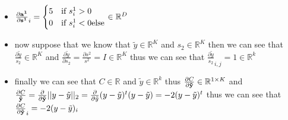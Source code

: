 \documentclass{article}
\begin{document}
\begin{enumerate}[(a)]
\begin{itemize}
    \color{blue}
\item $\frac{\partial \bold{a^{1}}}{\partial \bold{s^{1}}}_{i}=\begin{cases}
            5& \text{if }s^{1}_{i} > 0 \\
            0 & \text{if }s^{1}_{i} < 0 \text{else}
            \end{cases}\in \mathbb{R}^{D}$
    \item now suppose that we know that $\tilde{y}\in \mathbb{R}^{K}$ and $s_2\in \mathbb{R}^{K}$ then we can see that $\frac{\partial \tilde{y}}{s_2}\in \mathbb{R}^{K}$ and $\frac{\partial \tilde{y}}{\partial s_2}=\frac{\partial s^{2}}{s^{2}} = I\in \mathbb{R}^{K} $ thus we can see that $\frac{\partial \tilde{y}}{s_2}_{i,j}=1\in \mathbb{R}^{k}$
    \item finally we can see that $C\in \mathbb{R}$ and $\tilde{y}\in \mathbb{R}^{k}$ thus $\frac{\partial C}{\partial \bold{\tilde{y}}}\in \mathbb{R}^{1\times K}$ and $\frac{\partial C}{\bold{\tilde{y}}}=\frac{\partial}{\partial \bold{\tilde{y}}}||y-\tilde{y}||_{2}=\frac{\partial}{\partial \tilde{y}}(y-\tilde{y})^{t}(y-\tilde{y})=-2(y-\tilde{y})^{t}$ thus we can see that $\frac{\partial C}{\partial \bold{\tilde{y}}}_{i}=-2(y-\tilde{y})_{i}$
\end{itemize}

\end{enumerate}
\end{document}
